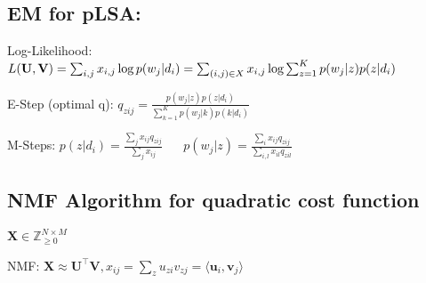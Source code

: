 \documentclass[a4paper, 11pt, landscape]{article}
\begin{document}
\begin{multicols*}{3}

\subsection{EM for pLSA:}
\begin{compactenum}
  \item Log-Likelihood: $L(\mathbf{U}, \mathbf{V}) = \sum_{i,j} x_{i,j}\log p(w_j|d_i) = \break \sum_{(i,j) \in X} x_{i,j}\log \sum_{z=1}^K p(w_j|z)p(z|d_i)$
	\item E-Step (optimal q): $q_{zij} = \frac{p(w_j|z)p(z|d_i)}{\sum_{k=1}^K p(w_j|k)p(k|d_i)}$
	\item M-Steps: $p(z|d_i) = \frac{\sum_j x_{ij}q_{zij}}{\sum_j x_{ij}} \hspace{20pt} p(w_j|z) = \frac{\sum_i x_{ij}q_{zij}}{\sum_{i,l}x_{il}q_{zil}}$
\end{compactenum}

\subsection{NMF Algorithm for quadratic cost function}
\begin{inparaitem}[\color{red}\textbullet]
	\item $\mathbf{X} \in \mathbb{Z}^{N \times M}_{\geq 0}$
	\item NMF: $\mathbf{X} \approx \mathbf{U^\top V}, x_{ij} = \sum_z u_{zi}v_{zj} = \langle \mathbf{u}_i, \mathbf{v}_j \rangle$
\end{inparaitem}


\end{multicols*}
\end{document}
